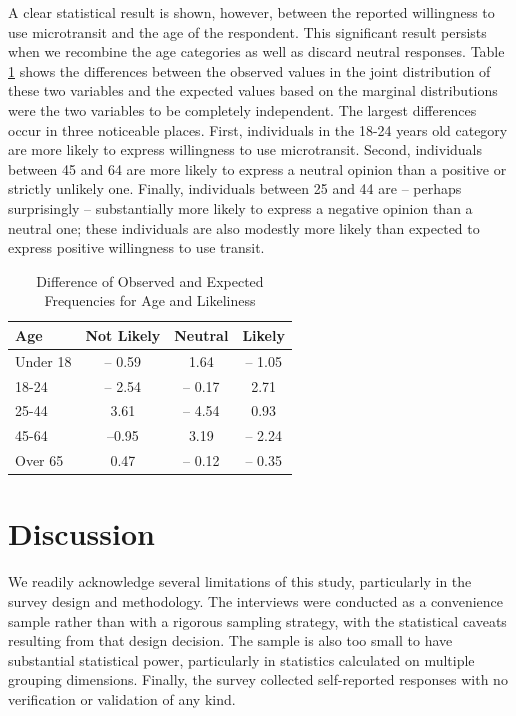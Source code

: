 \documentclass[smartcities,article,submit,moreauthors,pdftex]{Definitions/mdpi}
\begin{document}
A clear statistical result is shown, however, between the reported willingness to use microtransit and the age of the respondent. This significant result persists when we recombine the age categories as well as discard neutral responses. Table \ref{tab:age-difference} shows the differences between the observed values in the joint distribution of these two variables and the expected values based on the marginal distributions were the two variables to be completely independent. The largest differences occur in three noticeable places. First, individuals in the 18-24 years old category are more likely to express willingness to use microtransit. Second, individuals between 45 and 64 are more likely to express a neutral opinion than a positive or strictly unlikely one. Finally, individuals between 25 and 44 are – perhaps surprisingly – substantially more likely to express a negative opinion than a neutral one; these individuals are also modestly more likely than expected to express positive willingness to use transit.

\begin{table}[ht]
    \centering
         \renewcommand{\arraystretch}{1.5}
    \caption{Difference of Observed and Expected Frequencies for Age and Likeliness}
    \label{tab:age-difference}
    \begin{tabular}{@{}lccc@{}}
\toprule
Age      & Not Likely & Neutral & Likely \\
\midrule
Under 18 & – 0.59     & 1.64    & – 1.05 \\
18-24    & – 2.54     & – 0.17  & 2.71   \\
25-44    & 3.61       & – 4.54  & 0.93   \\
45-64    & –0.95      & 3.19    & – 2.24 \\
Over 65  & 0.47       & – 0.12  & – 0.35\\
\bottomrule
\end{tabular}
\end{table}

\section{Discussion}
We readily acknowledge several limitations of this study, particularly in the survey design and methodology. The interviews were conducted as a convenience sample rather than with a rigorous sampling strategy, with the statistical caveats resulting from that design decision. The sample is also too small to have substantial statistical power, particularly in statistics calculated on multiple grouping dimensions. Finally, the survey collected self-reported responses with no verification or validation of any kind.
\end{document}
